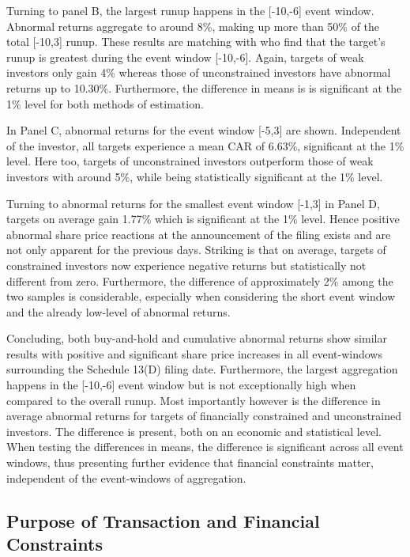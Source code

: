 \documentclass[12pt]{article}
\begin{document}
Turning to panel B, the largest runup happens in the [-10,-6] event window. Abnormal returns aggregate to around 8\%, making up more than 50\% of the total [-10,3] runup. These results are matching with \citet[p.32]{Brigida2012} who find that the target's runup is greatest during the event window [-10,-6]. Again, targets of weak investors only gain 4\% whereas those of unconstrained investors have abnormal returns up to 10.30\%. Furthermore, the difference in means is is significant at the 1\% level for both methods of estimation.\par
In Panel C, abnormal returns for the event window [-5,3] are shown. Independent of the investor, all targets experience a mean CAR of 6.63\%, significant at the 1\% level. Here too, targets of unconstrained investors outperform those of weak investors with around 5\%, while being statistically significant at the 1\% level.\par
Turning to abnormal returns for the smallest event window [-1,3] in Panel D, targets on average gain 1.77\% which is significant at the 1\% level. Hence positive abnormal share price reactions at the announcement of the filing exists and are not only apparent for the previous days. Striking is that on average, targets of constrained investors now experience negative returns but statistically not different from zero. Furthermore, the difference of approximately 2\%  among the two samples is considerable, especially  when considering the short event window and the already low-level of abnormal returns.\par
Concluding, both buy-and-hold and cumulative abnormal returns show similar results with positive and significant share price increases in all event-windows surrounding the Schedule 13(D) filing date. Furthermore, the largest aggregation happens in the [-10,-6] event window but is not exceptionally high when compared to the overall runup. Most importantly however is the difference in average abnormal returns for targets of financially constrained and unconstrained investors. The difference is present, both on an economic and statistical level. When testing the differences in means, the difference is significant across all event windows, thus presenting further evidence that financial constraints matter, independent of the event-windows of aggregation.

\subsection{Purpose of Transaction and Financial Constraints}
\end{document}
